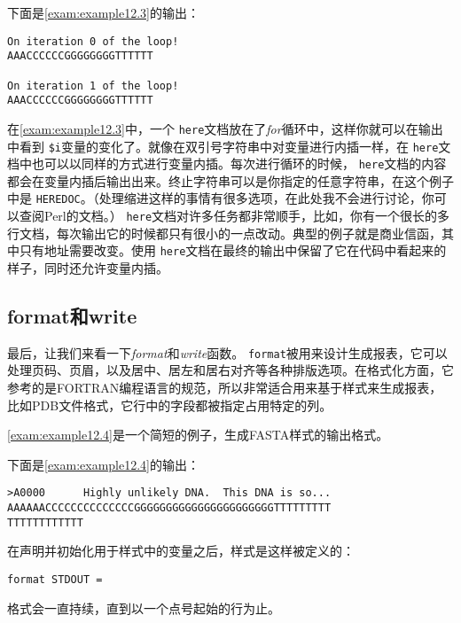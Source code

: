 下面是\autoref{exam:example12.3}的输出：

\begin{lstlisting}
On iteration 0 of the loop!
AAACCCCCCGGGGGGGGTTTTTT

On iteration 1 of the loop!
AAACCCCCCGGGGGGGGTTTTTT
\end{lstlisting}

在\autoref{exam:example12.3}中，一个 \verb|here|文档放在了\textit{for}循环中，这样你就可以在输出中看到 \verb|$i|变量的变化了。就像在双引号字符串中对变量进行内插一样，在 \verb|here|文档中也可以以同样的方式进行变量内插。每次进行循环的时候， \verb|here|文档的内容都会在变量内插后输出出来。终止字符串可以是你指定的任意字符串，在这个例子中是 \verb|HEREDOC|。（处理缩进这样的事情有很多选项，在此处我不会进行讨论，你可以查阅Perl的文档。） \verb|here|文档对许多任务都非常顺手，比如，你有一个很长的多行文档，每次输出它的时候都只有很小的一点改动。典型的例子就是商业信函，其中只有地址需要改变。使用 \verb|here|文档在最终的输出中保留了它在代码中看起来的样子，同时还允许变量内插。

\subsection{format和write}
最后，让我们来看一下\textit{format}和\textit{write}函数。 \verb|format|被用来设计生成报表，它可以处理页码、页眉，以及居中、居左和居右对齐等各种排版选项。在格式化方面，它参考的是FORTRAN编程语言的规范，所以非常适合用来基于样式来生成报表，比如PDB文件格式，它行中的字段都被指定占用特定的列。

\autoref{exam:example12.4}是一个简短的例子，生成FASTA样式的输出格式。



下面是\autoref{exam:example12.4}的输出：

\begin{lstlisting}
>A0000      Highly unlikely DNA.  This DNA is so...
AAAAAACCCCCCCCCCCCCCGGGGGGGGGGGGGGGGGGGGGGTTTTTTTTT
TTTTTTTTTTTT
\end{lstlisting}

在声明并初始化用于样式中的变量之后，样式是这样被定义的：

\begin{lstlisting}
format STDOUT =
\end{lstlisting}

格式会一直持续，直到以一个点号起始的行为止。

